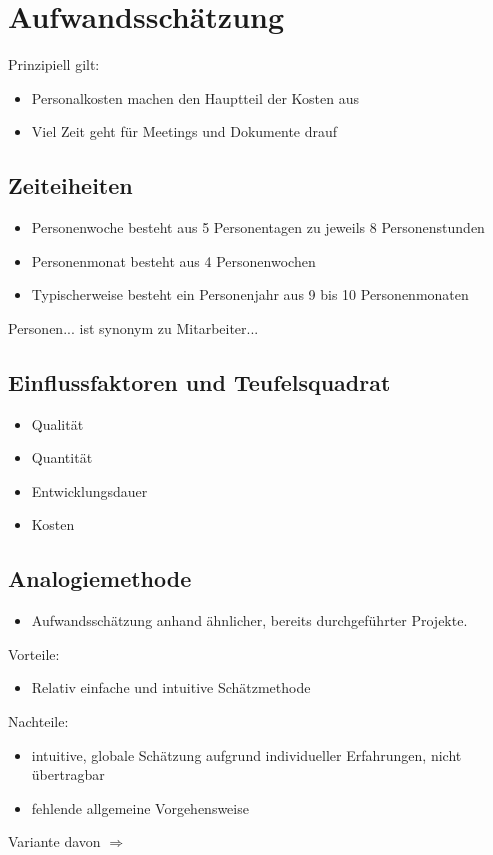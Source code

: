 \section{Aufwandsschätzung}
Prinzipiell gilt:
\begin{itemize}
    \item Personalkosten machen den Hauptteil der Kosten aus
    \item Viel Zeit geht für Meetings und Dokumente drauf
\end{itemize}

\subsection{Zeiteiheiten}
\begin{itemize}
    \item Personenwoche besteht aus 5 Personentagen zu jeweils 8 Personenstunden
    \item Personenmonat besteht aus 4 Personenwochen
    \item Typischerweise besteht ein Personenjahr aus 9 bis 10 Personenmonaten
\end{itemize}

Personen... ist synonym zu Mitarbeiter...

\subsection{Einflussfaktoren und Teufelsquadrat}
\begin{itemize}
    \item Qualität
    \item Quantität
    \item Entwicklungsdauer
    \item Kosten
\end{itemize}


\subsection{Analogiemethode}
\begin{itemize}
    \item Aufwandsschätzung anhand ähnlicher, bereits durchgeführter Projekte.
\end{itemize}
Vorteile:
\begin{itemize}
    \item Relativ einfache und intuitive Schätzmethode
\end{itemize}
Nachteile:
\begin{itemize}
    \item intuitive, globale Schätzung aufgrund individueller Erfahrungen, nicht übertragbar
    \item fehlende allgemeine Vorgehensweise
\end{itemize}
Variante davon $\Rightarrow$ 


